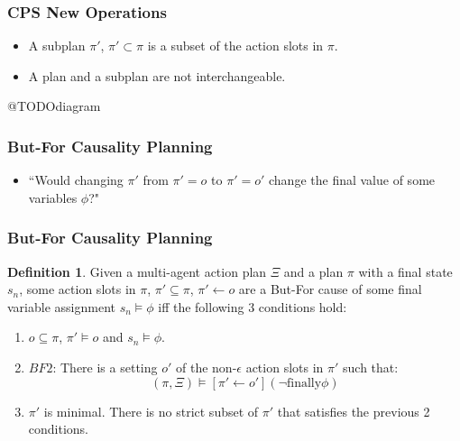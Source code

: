 \documentclass{beamer}
\theoremstyle{plain}
\theoremstyle{definition}
\newtheorem{defn}[thm]{Definition} %
\begin{document}
\begin{frame}
\frametitle{CPS New Operations}
\begin{itemize}
\item A subplan $\pi'$, $\pi'\subset \pi$ is a subset of the action slots in $\pi$.
\item A plan and a subplan are not interchangeable.
\end{itemize}

@TODOdiagram

\end{frame}


\begin{frame}
\frametitle{But-For Causality Planning}
\begin{itemize}
\item ``Would changing $\pi'$ from $\pi'=o$ to $\pi'= o'$ change the final value of some variables $\phi$?"
\end{itemize}

\end{frame}

\begin{frame}
\frametitle{But-For Causality Planning}
\begin{defn} 

Given a multi-agent action plan $\Xi$ and a plan $\pi$ with a final state $s_n$, some action slots in $\pi$, $\pi' \subseteq \pi$, $\pi' \leftarrow o$ are a But-For cause of some final variable assignment $s_n \models \phi$ iff the following 3 conditions hold:
\begin{enumerate}
\item  $o \subseteq \pi$, $\pi' \models o$ and $s_n \models \phi$.
\item $BF2$: There is a setting $o'$ of the non-$\epsilon$ action slots in $\pi'$ such that:
\[
(\pi, \Xi) \models [\pi' \leftarrow o'](\lnot \textrm{finally} \phi)
\]
\item $\pi'$ is minimal. There is no strict subset of $\pi'$ that satisfies the previous 2 conditions.
\end{enumerate}


\end{defn}

\end{frame}
\end{document}
